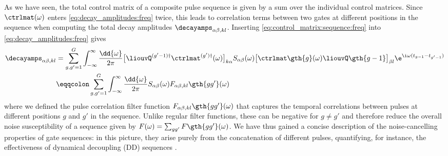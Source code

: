 As we have seen, the total control matrix of a composite pulse sequence is given by a sum over the individual control matrices. Since $\ctrlmat(\omega)$ enters \cref{eq:decay_amplitudes:freq} twice, this leads to correlation terms between two gates at different positions in the sequence when computing the total decay amplitudes $\decayamps_{\alpha\beta,kl}$. Inserting \cref{eq:control_matrix:sequence:freq} into \cref{eq:decay_amplitudes:freq} gives
\begin{equation}\label{eq:decay_amplitudes:pulse_correlation}
\begin{split}
    \decayamps_{\alpha\beta,kl} &= \sum_{g,g'=1}^{G}\int_{-\infty}^\infty\frac{\dd{\omega}}{2\pi}
                                     \bigl[\liouvQ^{(g'-1)\dagger}\ctrlmat^{(g')\dagger}(\omega)\bigr]_{k\alpha}
                                     S_{\alpha\beta}(\omega)
                                     \bigl[\ctrlmat\gth{g}(\omega)\liouvQ\gth{g-1}\bigr]_{\beta l}
                                     \e^{\i\omega(t_{g-1} - t_{g'-1})} \\
                                &\eqqcolon\sum_{g,g'=1}^{G}\int_{-\infty}^\infty\frac{\dd{\omega}}{2\pi}
                                     S_{\alpha\beta}(\omega) F_{\alpha\beta,kl}\gth{gg'}(\omega)
\end{split}
\end{equation}
where we defined the pulse correlation filter function $F_{\alpha\beta,kl}\gth{gg'}(\omega)$ that captures the temporal correlations between pulses at different positions $g$ and $g'$ in the sequence. Unlike regular filter functions, these can be negative for $g\neq g'$ and therefore reduce the overall noise susceptibility of a sequence given by $F(\omega) = \sum_{gg'}F\gth{gg'}(\omega)$. We have thus gained a concise description of the noise-cancelling properties of gate sequences: in this picture, they arise purely from the concatenation of different pulses, quantifying, for instance, the effectiveness of dynamical decoupling (DD) sequences \cite{Cerfontaine2021}.

